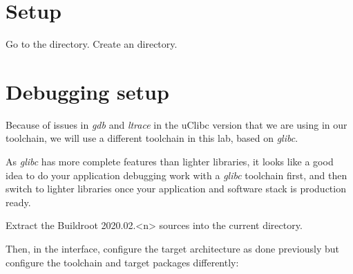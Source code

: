 
\section{Setup}

Go to the  directory.
Create an  directory.

\section{Debugging setup}

Because of issues in {\em gdb} and {\em ltrace} in the uClibc version
that we are using in our toolchain, we will use a different toolchain
in this lab, based on {\em glibc}. 

As {\em glibc} has more complete features than lighter libraries,
it looks like a good idea to do your application debugging work
with a {\em glibc} toolchain first, and then switch to lighter libraries
once your application and software stack is production ready. 

Extract the Buildroot 2020.02.<n> sources into the current directory.

Then, in the  interface, configure the target
architecture as done previously but configure the toolchain and
target packages differently:

